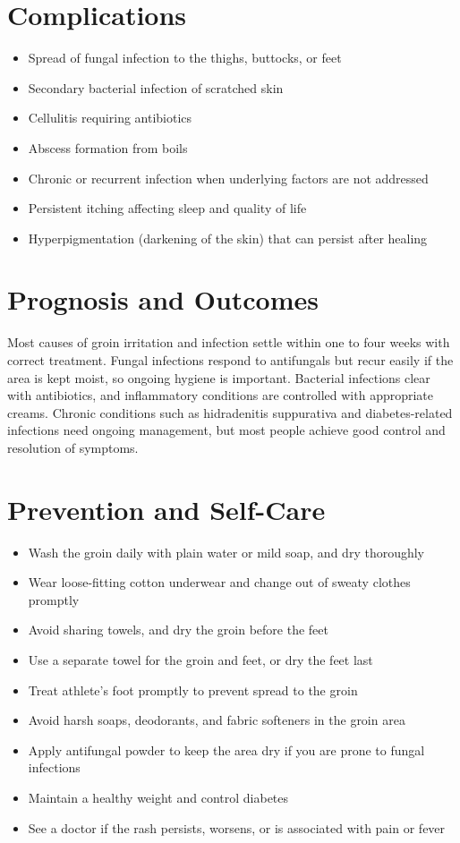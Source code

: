 \section*{Complications}
\begin{itemize}
    \item Spread of fungal infection to the thighs, buttocks, or feet
    \item Secondary bacterial infection of scratched skin
    \item Cellulitis requiring antibiotics
    \item Abscess formation from boils
    \item Chronic or recurrent infection when underlying factors are not addressed
    \item Persistent itching affecting sleep and quality of life
    \item Hyperpigmentation (darkening of the skin) that can persist after healing
\end{itemize}

\section*{Prognosis and Outcomes}
Most causes of groin irritation and infection settle within one to four weeks with correct treatment. Fungal infections respond to antifungals but recur easily if the area is kept moist, so ongoing hygiene is important. Bacterial infections clear with antibiotics, and inflammatory conditions are controlled with appropriate creams. Chronic conditions such as hidradenitis suppurativa and diabetes-related infections need ongoing management, but most people achieve good control and resolution of symptoms.

\section*{Prevention and Self-Care}
\begin{itemize}
    \item Wash the groin daily with plain water or mild soap, and dry thoroughly
    \item Wear loose-fitting cotton underwear and change out of sweaty clothes promptly
    \item Avoid sharing towels, and dry the groin before the feet
    \item Use a separate towel for the groin and feet, or dry the feet last
    \item Treat athlete's foot promptly to prevent spread to the groin
    \item Avoid harsh soaps, deodorants, and fabric softeners in the groin area
    \item Apply antifungal powder to keep the area dry if you are prone to fungal infections
    \item Maintain a healthy weight and control diabetes
    \item See a doctor if the rash persists, worsens, or is associated with pain or fever
\end{itemize}

